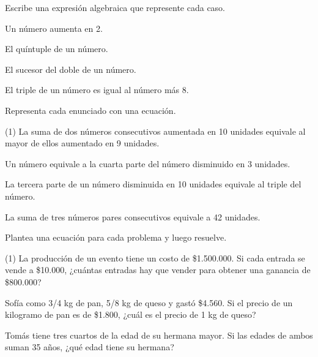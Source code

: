 \documentclass[sin nombre]{plantilla-evaluacion-v1}
\begin{document}
\begin{partes}
  \parte Escribe una expresión algebraica que represente cada caso.
  \begin{ejercicios}
    \ejercicio Un número aumenta en 2.
    \begin{malla}[height=2cm]
    \end{malla}
    \ejercicio El quíntuple de un número.
    \begin{malla}[height=2cm]
    \end{malla}
    \ejercicio El sucesor del doble de un número.
    \begin{malla}[height=2cm]
    \end{malla}
    \ejercicio El triple de un número es igual al número más 8.
    \begin{malla}[height=2cm]
    \end{malla}
  \end{ejercicios}

  \parte Representa cada enunciado con una ecuación.
  \begin{ejercicios}(1)
    \ejercicio La suma de dos números consecutivos aumentada en 10 unidades equivale
    al mayor de ellos aumentado en 9 unidades.
    \begin{malla}[height=2cm]
    \end{malla}
    \ejercicio Un número equivale a la cuarta parte del número disminuido en 3 unidades.
    \begin{malla}[height=2cm]
    \end{malla}
    \ejercicio La tercera parte de un número disminuida en 10 unidades equivale al
    triple del número.
    \begin{malla}[height=2cm]
    \end{malla}
    \ejercicio La suma de tres números pares consecutivos equivale a 42 unidades.
    \begin{malla}[height=2cm]
    \end{malla}
  \end{ejercicios}
  
  \parte Plantea una ecuación para cada problema y luego resuelve.
  \begin{ejercicios}(1)
    \ejercicio La producción de un evento tiene un costo de \$1.500.000. Si 
    cada entrada se vende a \$10.000, ¿cuántas entradas hay que vender 
    para obtener una ganancia de \$800.000?
    \begin{malla}[height=6cm]
    \end{malla}
    \ejercicio Sofía como 3/4 kg de pan, 5/8 kg de queso y
    gastó \$4.560. Si el precio de un kilogramo de pan es de \$1.800, ¿cuál 
    es el precio de 1 kg de queso?
    \begin{malla}[height=6cm]
    \end{malla}
    \ejercicio Tomás tiene tres cuartos de la edad de su hermana mayor. Si las
    edades de ambos suman 35 años, ¿qué edad tiene su hermana?
    \begin{malla}[height=6cm]
    \end{malla}
  \end{ejercicios}
\end{partes}
\end{document}
